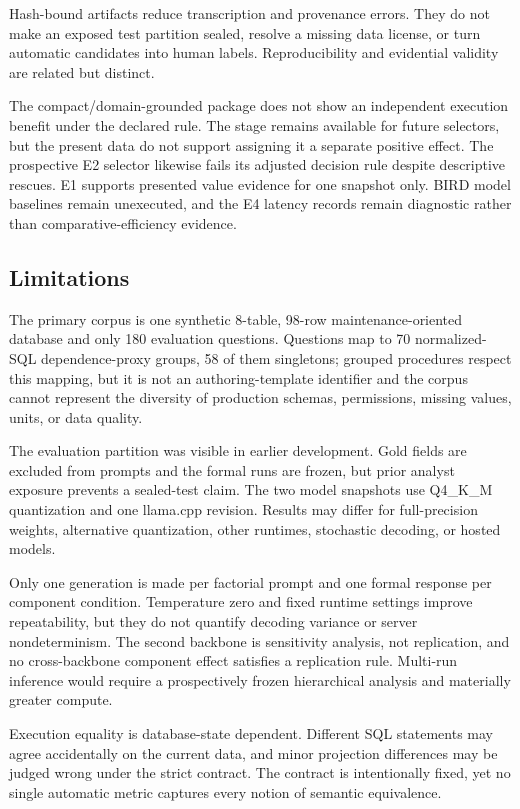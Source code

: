 \documentclass[applsci,article,submit,moreauthors]{Definitions/mdpi}
\begin{document}
Hash-bound artifacts reduce transcription and provenance errors. They do not make an exposed test partition sealed, resolve a missing data license, or turn automatic candidates into human labels. Reproducibility and evidential validity are related but distinct.

The compact/domain-grounded package does not show an independent execution benefit under the declared rule. The stage remains available for future selectors, but the present data do not support assigning it a separate positive effect. The prospective E2 selector likewise fails its adjusted decision rule despite descriptive rescues. E1 supports presented value evidence for one snapshot only. BIRD model baselines remain unexecuted, and the E4 latency records remain diagnostic rather than comparative-efficiency evidence.

\subsection{Limitations}
The primary corpus is one synthetic 8-table, 98-row maintenance-oriented database and only 180 evaluation questions. Questions map to 70 normalized-SQL dependence-proxy groups, 58 of them singletons; grouped procedures respect this mapping, but it is not an authoring-template identifier and the corpus cannot represent the diversity of production schemas, permissions, missing values, units, or data quality.

The evaluation partition was visible in earlier development. Gold fields are excluded from prompts and the formal runs are frozen, but prior analyst exposure prevents a sealed-test claim. The two model snapshots use Q4\_K\_M quantization and one llama.cpp revision. Results may differ for full-precision weights, alternative quantization, other runtimes, stochastic decoding, or hosted models.

Only one generation is made per factorial prompt and one formal response per component condition. Temperature zero and fixed runtime settings improve repeatability, but they do not quantify decoding variance or server nondeterminism. The second backbone is sensitivity analysis, not replication, and no cross-backbone component effect satisfies a replication rule. Multi-run inference would require a prospectively frozen hierarchical analysis and materially greater compute.

Execution equality is database-state dependent. Different SQL statements may agree accidentally on the current data, and minor projection differences may be judged wrong under the strict contract. The contract is intentionally fixed, yet no single automatic metric captures every notion of semantic equivalence.
\end{document}
